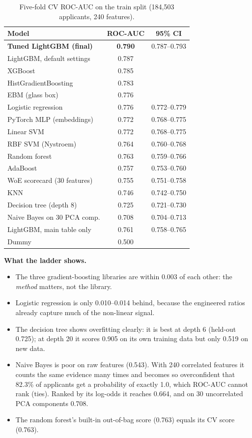 \documentclass[conference,10pt]{IEEEtran}
\begin{document}
\begin{table}[t]
\centering\small
\caption{Five-fold CV ROC-AUC on the train split (184,503 applicants, 240 features).}
\label{tab:ladder}
\begin{tabular}{@{}lcc@{}}
\toprule
Model & ROC-AUC & 95\% CI \\
\midrule
\textbf{Tuned LightGBM (final)} & \textbf{0.790} & 0.787--0.793 \\
LightGBM, default settings & 0.787 & \\
XGBoost & 0.785 & \\
HistGradientBoosting & 0.783 & \\
EBM (glass box) & 0.776 & \\
Logistic regression & 0.776 & 0.772--0.779 \\
PyTorch MLP (embeddings) & 0.772 & 0.768--0.775 \\
Linear SVM & 0.772 & 0.768--0.775 \\
RBF SVM (Nystroem) & 0.764 & 0.760--0.768 \\
Random forest & 0.763 & 0.759--0.766 \\
AdaBoost & 0.757 & 0.753--0.760 \\
WoE scorecard (30 features) & 0.755 & 0.751--0.758 \\
KNN & 0.746 & 0.742--0.750 \\
Decision tree (depth 8) & 0.725 & 0.721--0.730 \\
Naive Bayes on 30 PCA comp. & 0.708 & 0.704--0.713 \\
\midrule
LightGBM, main table only & 0.761 & 0.758--0.765 \\
Dummy & 0.500 & \\
\bottomrule
\end{tabular}
\end{table}

\textbf{What the ladder shows.}
\begin{itemize}
\item The three gradient-boosting libraries are within 0.003 of each other: the \emph{method}
matters, not the library.
\item Logistic regression is only 0.010--0.014 behind, because the engineered ratios already
capture much of the non-linear signal.
\item The decision tree shows overfitting clearly: it is best at depth 6 (held-out 0.725); at
depth 20 it scores 0.905 on its own training data but only 0.519 on new data.
\item Naive Bayes is poor on raw features (0.543). With 240 correlated features it counts the
same evidence many times and becomes so overconfident that 82.3\% of applicants get a
probability of exactly 1.0, which ROC-AUC cannot rank (ties). Ranked by its log-odds it reaches
0.664, and on 30 uncorrelated PCA components 0.708.
\item The random forest's built-in out-of-bag score (0.763) equals its CV score (0.763).
\end{itemize}
\end{document}
